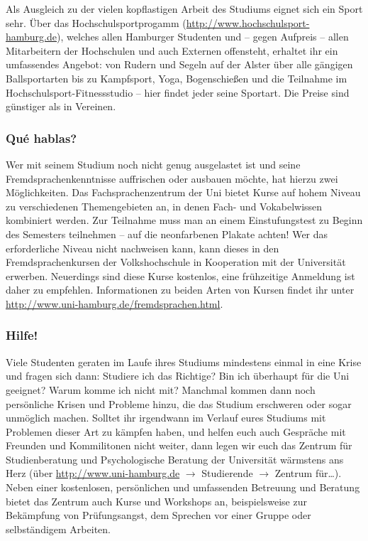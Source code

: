 Als Ausgleich zu der vielen kopflastigen Arbeit des Studiums eignet sich ein
Sport sehr. Über das Hochschulsportprogamm
(\url{http://www.hochschulsport-hamburg.de}), welches allen Hamburger Studenten
und -- gegen Aufpreis -- allen Mitarbeitern der Hochschulen und auch Externen
offensteht, erhaltet ihr ein umfassendes Angebot: von Rudern und Segeln auf der
Alster über alle gängigen Ballsportarten bis zu Kampfsport, Yoga, Bogenschießen
und die Teilnahme im Hochschulsport-Fitnessstudio -- hier findet jeder seine
Sportart.  Die Preise sind günstiger als in Vereinen.

\subsubsection{Qu\'{e} hablas?}

Wer mit seinem Studium noch nicht genug ausgelastet ist und seine
Fremdsprachenkenntnisse auffrischen oder ausbauen möchte, hat hierzu zwei
Möglichkeiten. Das Fachsprachenzentrum der Uni bietet Kurse auf hohem Niveau zu
verschiedenen Themengebieten an, in denen Fach- und Vokabelwissen kombiniert
werden. Zur Teilnahme muss man an einem Einstufungstest zu Beginn des Semesters
teilnehmen -- auf die neonfarbenen Plakate achten! Wer das erforderliche Niveau
nicht nachweisen kann, kann dieses in den Fremdsprachenkursen der
Volkshochschule in Kooperation mit der Universität erwerben. Neuerdings sind
diese Kurse kostenlos, eine frühzeitige Anmeldung ist daher zu empfehlen.
Informationen zu beiden Arten von Kursen findet ihr unter
\url{http://www.uni-hamburg.de/fremdsprachen.html}.

\subsubsection{Hilfe!}

Viele Studenten geraten im Laufe ihres Studiums mindestens einmal in eine Krise
und fragen sich dann: Studiere ich das Richtige? Bin ich überhaupt für die Uni
geeignet? Warum komme ich nicht mit? Manchmal kommen dann noch persönliche
Krisen und Probleme hinzu, die das Studium erschweren oder sogar unmöglich
machen. Solltet ihr irgendwann im Verlauf eures Studiums mit Problemen dieser
Art zu kämpfen haben, und helfen euch auch Gespräche mit Freunden und
Kommilitonen nicht weiter, dann legen wir euch das Zentrum für Studienberatung
und Psychologische Beratung der Universität wärmstens ans Herz (über
\url{http://www.uni-hamburg.de} $\rightarrow$ Studierende $\rightarrow$ Zentrum
für\ldots).  Neben einer kostenlosen, persönlichen und umfassenden Betreuung
und Beratung bietet das Zentrum auch Kurse und Workshops an, beispielsweise zur
Bekämpfung von Prüfungsangst, dem Sprechen vor einer Gruppe oder selbständigem
Arbeiten.

